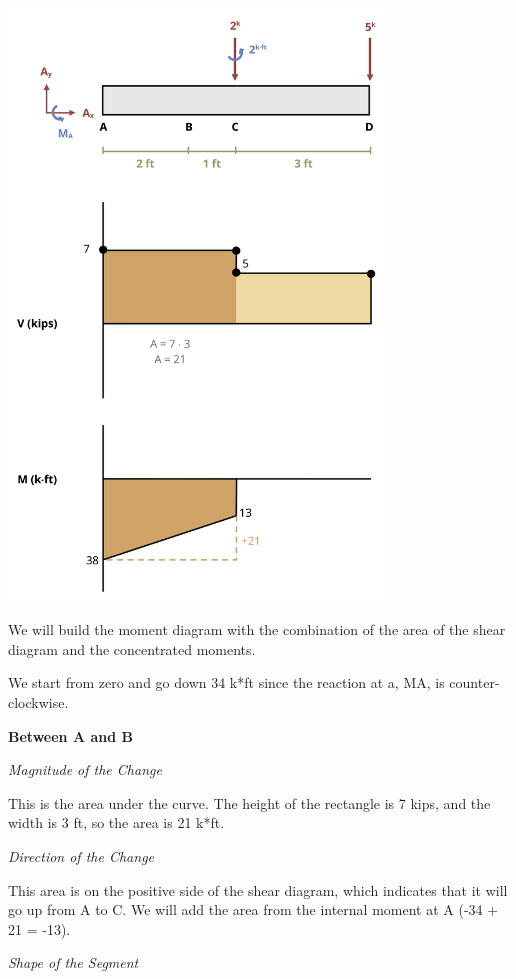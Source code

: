 \documentclass[
  letterpaper,
  DIV=11,
  numbers=noendperiod]{scrreprt}
\begin{document}
\begin{tcolorbox}
\begin{center}
\includegraphics[width=3.97917in,height=\textheight]{images/CH7 PNGs/example 7.4 part 4.png}
\end{center}

We will build the moment diagram with the combination of the area of the
shear diagram and the concentrated moments.

We start from zero and go down 34 k*ft since the reaction at a, MA, is
counter-clockwise.

\textbf{Between A and B}

\emph{Magnitude of the Change}

This is the area under the curve. The height of the rectangle is 7 kips,
and the width is 3 ft, so the area is 21 k*ft.

\emph{Direction of the Change}

This area is on the positive side of the shear diagram, which indicates
that it will go up from A to C. We will add the area from the internal
moment at A (-34 + 21 = -13).

\emph{Shape of the Segment}


\end{tcolorbox}
\end{document}
